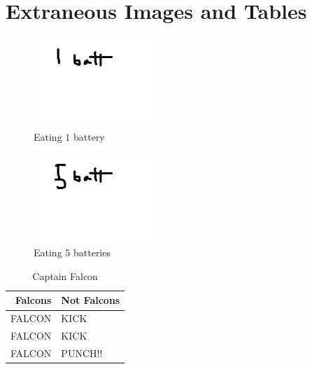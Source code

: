 \chapter{Extraneous Images and Tables}

\begin{figure}[h]
\label{fig:onebattery}
\centering
\includegraphics[width=0.4\textwidth]{fig/onebattery}
\caption{Eating \(1\) battery}
\end{figure}

\begin{figure}[h]
\label{fig:fivebatteries}
\centering
\includegraphics[width=0.4\textwidth]{fig/fivebatteries}
\caption{Eating \(5\) batteries}
\end{figure}

\begin{table}[h]
\label{tab:ssb}
\caption{Captain Falcon}
\centering
\begin{tabular}{r | l}
Falcons & Not Falcons\\
\hline
FALCON & KICK\\
FALCON & KICK\\
FALCON & PUNCH!!
\end{tabular}
\end{table}
